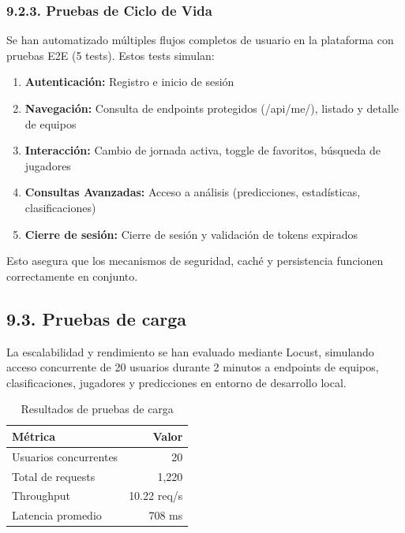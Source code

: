 \subsubsection{9.2.3. Pruebas de Ciclo de Vida}

Se han automatizado múltiples flujos completos de usuario en la 
plataforma con pruebas E2E (5 tests). Estos tests simulan:

\begin{enumerate}
  \item \textbf{Autenticación:} Registro e inicio de sesión
  \item \textbf{Navegación:} Consulta de endpoints protegidos 
        (/api/me/), listado y detalle de equipos
  \item \textbf{Interacción:} Cambio de jornada activa, toggle de 
        favoritos, búsqueda de jugadores
  \item \textbf{Consultas Avanzadas:} Acceso a análisis 
        (predicciones, estadísticas, clasificaciones)
  \item \textbf{Cierre de sesión:} Cierre de sesión y validación 
        de tokens expirados
\end{enumerate}

Esto asegura que los mecanismos de seguridad, caché y persistencia 
funcionen correctamente en conjunto.


\subsection{9.3. Pruebas de carga}

La escalabilidad y rendimiento se han evaluado mediante Locust, 
simulando acceso concurrente de 20 usuarios durante 2 minutos a 
endpoints de equipos, clasificaciones, jugadores y predicciones en 
entorno de desarrollo local.

\begin{table}[H]
\centering
\small
\begin{tabular}{|l|r|}
\hline
\textbf{Métrica} & \textbf{Valor} \\
\hline
Usuarios concurrentes & 20 \\
Total de requests & 1,220 \\
Throughput & 10.22 req/s \\
Latencia promedio & 708 ms \\
\hline
\end{tabular}
\caption{Resultados de pruebas de carga}
\end{table}

